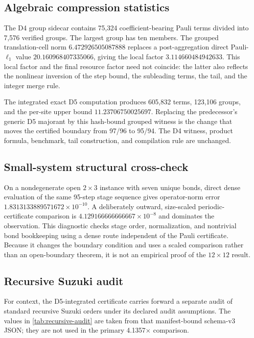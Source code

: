 \subsection{Algebraic compression statistics}

The D4 group sidecar contains 75,324 coefficient-bearing Pauli terms divided
into 7,576 verified groups.  The largest group has ten members.  The grouped
translation-cell norm $6.472926505087888$ replaces a post-aggregation direct
Pauli-$\ell_1$ value $20.160968407335066$, giving the local factor
$3.114660484942633$.  This local factor and the final resource factor need not
coincide: the latter also reflects the nonlinear inversion of the step bound,
the subleading terms, the tail, and the integer merge rule.

The integrated exact D5 computation produces 605,832 terms, 123,106 groups,
and the per-site upper bound $11.23706750025697$.  Replacing the predecessor's
generic D5 majorant by this hash-bound grouped witness is the change that moves
the certified boundary from 97/96 to 95/94.  The D4 witness, product formula,
benchmark, tail construction, and compilation rule are unchanged.

\subsection{Small-system structural cross-check}

On a nondegenerate open $2\times3$ instance with seven unique bonds, direct
dense evaluation of the same 95-step stage sequence gives operator-norm error
$1.8313133889571672\times10^{-10}$.  A deliberately outward, size-scaled
periodic-certificate comparison is $4.129166666666667\times10^{-8}$ and
dominates the observation.  This diagnostic checks stage order, normalization,
and nontrivial bond bookkeeping using a dense route independent of the Pauli
certificate.  Because it changes the boundary condition and uses a scaled
comparison rather than an open-boundary theorem, it is not an empirical proof
of the $12\times12$ result.

\subsection{Recursive Suzuki audit}

For context, the D5-integrated certificate carries forward a separate audit of
standard recursive Suzuki orders under its declared audit assumptions.  The
values in \cref{tab:recursive-audit} are taken from that manifest-bound
schema-v3 JSON; they are not used in the primary 4.1357$\times$ comparison.

